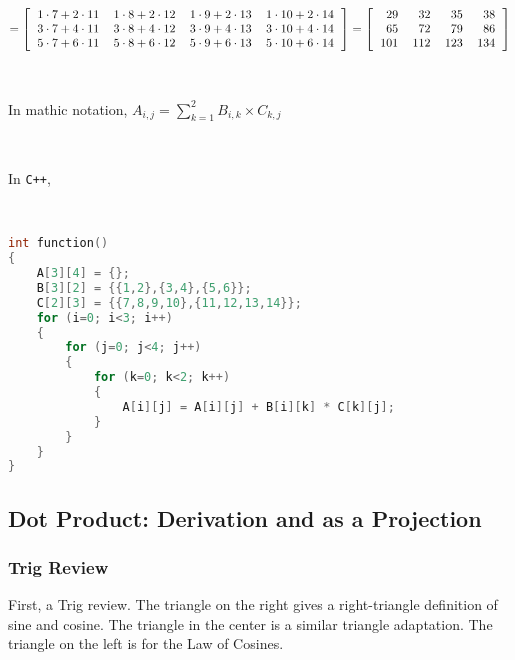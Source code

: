 \

$\displaystyle = 
\left[
\begin{tabular}{*4{>{$}r<{$}}}
	1 \cdot 7 + 2 \cdot 11 & 
	1 \cdot 8 + 2 \cdot 12 &
	1 \cdot 9 + 2 \cdot 13 &
	1 \cdot 10 + 2 \cdot 14 \cr
	3 \cdot  7 + 4 \cdot 11 &
	3 \cdot  8 + 4 \cdot 12 &
	3 \cdot  9 + 4 \cdot 13 &
	3 \cdot  10 + 4 \cdot 14 \cr
	5 \cdot  7 + 6 \cdot 11  &
	5 \cdot  8 + 6 \cdot 12  &
	5 \cdot  9 + 6 \cdot 13  &
	5 \cdot  10 + 6 \cdot 14  \cr
\end{tabular}
\right]
=\left[
\begin{tabular}{*4{>{$}r<{$}}}
	29 & 32 & 35 & 38 \cr
	65 & 72 & 79 & 86 \cr
	101 & 112 & 123 & 134 \cr
\end{tabular}
\right]
$

\

In mathic notation, $\displaystyle A_{i,j} = \sum_{k=1}^2 B_{i,k} \times C_{k,j}$

\

In {\tt C++},

\

\begin{lstlisting}[language=C++, caption={Matrix-Matrix Multiplication}]
int function()
{
	A[3][4] = {};
	B[3][2] = {{1,2},{3,4},{5,6}};
	C[2][3] = {{7,8,9,10},{11,12,13,14}};
	for (i=0; i<3; i++)
	{
		for (j=0; j<4; j++)
		{
			for (k=0; k<2; k++)
			{
				A[i][j] = A[i][j] + B[i][k] * C[k][j];
			}
		}
	}
}
\end{lstlisting}

\subsection{Dot Product: Derivation and as a Projection}

\subsubsection{Trig Review}

First, a Trig review.  The triangle on the right gives a right-triangle definition of sine and cosine.  The triangle in the center is a similar triangle adaptation.  The triangle on the left is for the Law of Cosines.  

\


